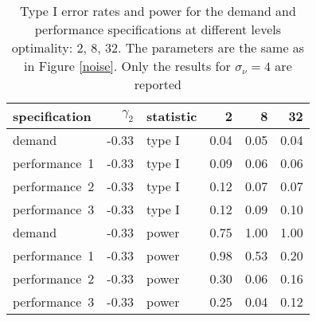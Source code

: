 \begin{table}[ht]
\centering
\begingroup\footnotesize
\begin{tabular}{lrlrrr}
  \hline
specification & $\gamma_2$ & statistic & 2 & 8 & 32 \\ 
  \hline
demand & -0.33 & type I & 0.04 & 0.05 & 0.04 \\ 
  performance~1 & -0.33 & type I & 0.09 & 0.06 & 0.06 \\ 
  performance~2 & -0.33 & type I & 0.12 & 0.07 & 0.07 \\ 
  performance~3 & -0.33 & type I & 0.12 & 0.09 & 0.10 \\ 
  demand & -0.33 & power & 0.75 & 1.00 & 1.00 \\ 
  performance~1 & -0.33 & power & 0.98 & 0.53 & 0.20 \\ 
  performance~2 & -0.33 & power & 0.30 & 0.06 & 0.16 \\ 
  performance~3 & -0.33 & power & 0.25 & 0.04 & 0.12 \\ 
   \hline
\end{tabular}
\endgroup
\caption{Type I error rates and power for the demand 
  and performance specifications at different levels optimality: 
  2, 8, 32. The parameters are the same as in Figure \ref{noise}.
  Only the results for $\sigma_{\nu} = 4$ are reported} 
\label{noise-table}
\end{table}
